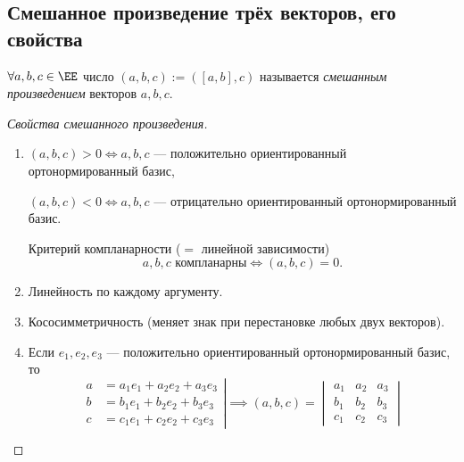 \subsection{Смешанное произведение трёх векторов, его свойства}

\begin{definition}
    $\forall a, b, c \in \EE$ число $(a, b, c) := ([a, b], c)$ называется \textit{смешанным произведением} векторов $a, b, c$.
\end{definition}

\begin{comment}
    Из \hyperref[lec25:t]{теоремы} видно, что $(a, b, c) = \Vol(a, b, c)$.
\end{comment}

\begin{proof}[Свойства смешанного произведения]~
    \begin{enumerate}[nosep]
    \item 
        $(a, b, c) > 0 \iff a, b, c$ --- положительно ориентированный ортонормированный базис,
        
        $(a, b, c) < 0 \iff a, b, c$ --- отрицательно ориентированный ортонормированный базис.

        \medskip
        Критерий компланарности ($= $ линейной зависимости)
        \begin{equation*}
            a, b, c\text{ компланарны} \iff (a, b, c) = 0
        .\end{equation*}

    \item Линейность по каждому аргументу.

    \item Кососимметричность (меняет знак при перестановке любых двух векторов).

    \item Если $e_1, e_2, e_3$ --- положительно ориентированный ортонормированный базис, то
        \begin{equation*}
            \left.\begin{aligned}
                a &= a_1 e_1 + a_2 e_2 + a_3 e_3 \\
                b &= b_1 e_1 + b_2 e_2 + b_3 e_3 \\
                c &= c_1 e_1 + c_2 e_2 + c_3 e_3
            \end{aligned} \right| \implies (a, b, c) = \begin{vmatrix} 
                a_1 & a_2 & a_3 \\
                b_1 & b_2 & b_3 \\
                c_1 & c_2 & c_3
            \end{vmatrix}
        \end{equation*}
    \end{enumerate}
\end{proof}


